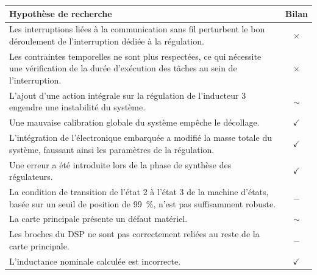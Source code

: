 \begin{table}[htbp]
    \centering
    \renewcommand{\arraystretch}{1.5} %
    \begin{tabular}{|p{12cm}|c|}
        \hline
        \textbf{Hypothèse de recherche}                                                                                                                      & \textbf{Bilan} \\
        \hline
        Les interruptions liées à la communication sans fil perturbent le bon déroulement de l'interruption dédiée à la régulation.                          & $\times$       \\
        \hline
        Les contraintes temporelles ne sont plus respectées, ce qui nécessite une vérification de la durée d'exécution des tâches au sein de l'interruption. & $\times$       \\
        \hline
        L'ajout d'une action intégrale sur la régulation de l'inducteur 3 engendre une instabilité du système.                                               & $\sim$         \\
        \hline
        Une mauvaise calibration globale du système empêche le décollage.                                                                                    & $\checkmark$   \\
        \hline
        L'intégration de l'électronique embarquée a modifié la masse totale du système, faussant ainsi les paramètres de la régulation.                      & $\checkmark$   \\
        \hline
        Une erreur a été introduite lors de la phase de synthèse des régulateurs.                                                                            & $\checkmark$   \\
        \hline
        La condition de transition de l'état 2 à l'état 3 de la machine d'états, basée sur un seuil de position de 99~\%, n'est pas suffisamment robuste.    & $-$            \\
        \hline
        La carte principale présente un défaut matériel.                                                                                                     & $\sim$         \\
        \hline
        Les broches du DSP ne sont pas correctement reliées au reste de la carte principale.                                                                 & $-$            \\
        \hline
        L'inductance nominale calculée est incorrecte.                                                                                                       & $\checkmark$   \\

\end{tabular}
\end{table}
